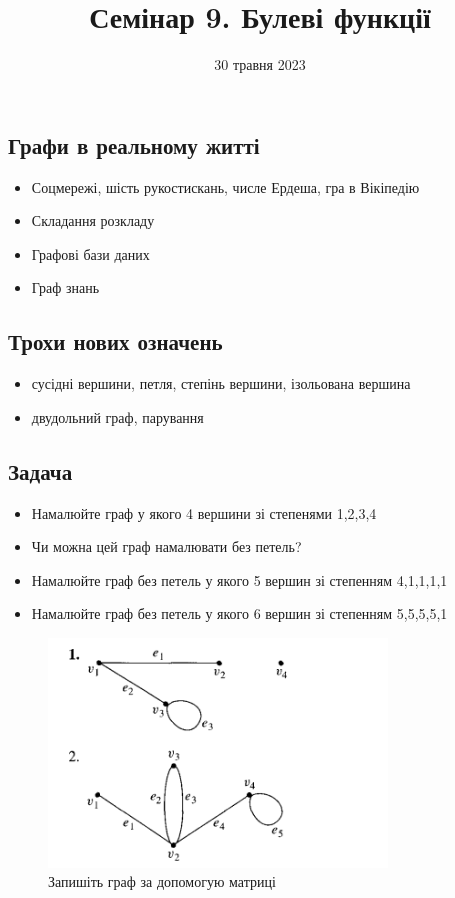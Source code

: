 \documentclass{article}
\begin{document}
\title{Семінар 9. Булеві функції}
\date{30 травня 2023}

\maketitle

\subsection*{Графи в реальному житті}
\begin{itemize}
    \item Соцмережі, шість рукостискань, числе Ердеша, гра в Вікіпедію
    \item Складання розкладу
    \item Графові бази даних
    \item Граф знань
\end{itemize}

\subsection*{Трохи нових означень}
\begin{itemize}
    \item сусідні вершини, петля, степінь вершини, ізольована вершина
    \item двудольний граф, парування
\end{itemize}

\subsection*{Задача}
\begin{itemize}
    \item Намалюйте граф у якого 4 вершини зі степенями 1,2,3,4
    \item Чи можна цей граф намалювати без петель?
    \item Намалюйте граф без петель у якого 5 вершин зі степенням 4,1,1,1,1
    \item Намалюйте граф без петель у якого 6 вершин зі степенням 5,5,5,5,1
\end{itemize}

\begin{figure}[ht!]
\centering
\includegraphics[width=90mm]{1}
\caption{Запишіть граф за допомогую матриці}
\end{figure}
\end{document}
